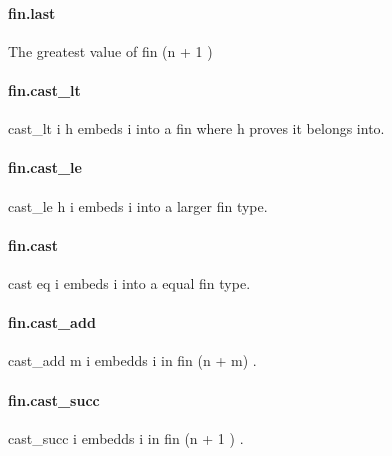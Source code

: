 \documentclass{article}
\begin{document}
\paragraph{fin.last}
\par
The greatest value of 
\colorbox[RGB]{253,246,227}{{{{\color[RGB]{101, 123, 131} fin (n }}}{{{\color[RGB]{181, 137, 0} + }}}{{{\color[RGB]{108, 113, 196} 1 }}}{{{\color[RGB]{101, 123, 131} ) }}}}\paragraph{fin.cast\_lt}
\par
\colorbox[RGB]{253,246,227}{{{{\color[RGB]{101, 123, 131} cast\_lt i h }}}} embeds 
\colorbox[RGB]{253,246,227}{{{{\color[RGB]{101, 123, 131} i }}}} into a 
\colorbox[RGB]{253,246,227}{{{{\color[RGB]{101, 123, 131} fin }}}} where 
\colorbox[RGB]{253,246,227}{{{{\color[RGB]{101, 123, 131} h }}}} proves it belongs into.
\paragraph{fin.cast\_le}
\par
\colorbox[RGB]{253,246,227}{{{{\color[RGB]{101, 123, 131} cast\_le h i }}}} embeds 
\colorbox[RGB]{253,246,227}{{{{\color[RGB]{101, 123, 131} i }}}} into a larger 
\colorbox[RGB]{253,246,227}{{{{\color[RGB]{101, 123, 131} fin }}}} type.
\paragraph{fin.cast}
\par
\colorbox[RGB]{253,246,227}{{{{\color[RGB]{101, 123, 131} cast eq i }}}} embeds 
\colorbox[RGB]{253,246,227}{{{{\color[RGB]{101, 123, 131} i }}}} into a equal 
\colorbox[RGB]{253,246,227}{{{{\color[RGB]{101, 123, 131} fin }}}} type.
\paragraph{fin.cast\_add}
\par
\colorbox[RGB]{253,246,227}{{{{\color[RGB]{101, 123, 131} cast\_add m i }}}} embedds 
\colorbox[RGB]{253,246,227}{{{{\color[RGB]{101, 123, 131} i }}}} in 
\colorbox[RGB]{253,246,227}{{{{\color[RGB]{101, 123, 131} fin (n }}}{{{\color[RGB]{181, 137, 0} + }}}{{{\color[RGB]{101, 123, 131} m) }}}}.
\paragraph{fin.cast\_succ}
\par
\colorbox[RGB]{253,246,227}{{{{\color[RGB]{101, 123, 131} cast\_succ i }}}} embedds 
\colorbox[RGB]{253,246,227}{{{{\color[RGB]{101, 123, 131} i }}}} in 
\colorbox[RGB]{253,246,227}{{{{\color[RGB]{101, 123, 131} fin (n }}}{{{\color[RGB]{181, 137, 0} + }}}{{{\color[RGB]{108, 113, 196} 1 }}}{{{\color[RGB]{101, 123, 131} ) }}}}.
\end{document}
